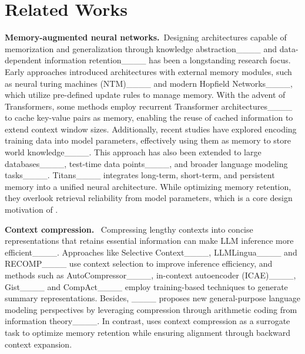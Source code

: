 \section{Related Works}
\label{sec:related works}

\noindent \textbf{Memory-augmented neural networks.}\ 
Designing architectures capable of memorization and generalization through knowledge abstraction____ and data-dependent information retention____ has been a longstanding research focus. 
Early approaches introduced architectures with external memory modules, such as neural turing machines (NTM)____ and modern Hopfield Networks____, which utilize pre-defined update rules to manage memory. With the advent of Transformers, some methods employ recurrent Transformer architectures____ to cache key-value pairs as memory, enabling the reuse of cached information to extend context window sizes. 
Additionally, recent studies have explored encoding training data into model parameters, effectively using them as memory to store world knowledge____. This approach has also been extended to large databases____, test-time data points____, and broader language modeling tasks____.
Titans____ integrates long-term, short-term, and persistent memory into a unified neural architecture.
While optimizing memory retention, they overlook retrieval reliability from model parameters, which is a core design motivation of \ourmethod{}.

\noindent \textbf{Context compression.}\ 
Compressing lengthy contexts into concise representations that retains essential information can make LLM inference more efficient____.
Approaches like Selective Context____, LLMLingua____ and RECOMP____ use context selection to improve inference efficiency, and methods such as AutoCompressor____, in-context autoencoder (ICAE)____, Gist____ and CompAct____ employ training-based techniques to generate summary representations. 
Besides, ____ proposes new general-purpose language modeling perspectives by leveraging compression through arithmetic coding from information theory____. 
In contrast, \ourmethod{} uses context compression as a surrogate task to optimize memory retention while ensuring alignment through backward context expansion.